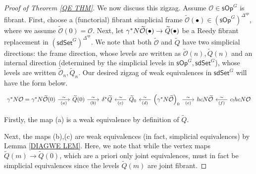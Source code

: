 \documentclass[a4paper,10pt]{article}%
\numberwithin{equation}{section}
\numberwithin{figure}{section}
\theoremstyle{definition} %
\renewcommand{\O}{\ensuremath{\mathcal O}}
\newcommand{\1}{\ensuremath{\mathbbm 1}}%
\begin{document}
\begin{proof}[Proof of Theorem \ref{QE THM}]
We now discuss this zigzag. Assume 
$\mathcal{O} \in \mathsf{sOp}^G$ is fibrant.
First, choose a (functorial) fibrant simplicial frame
$\widetilde{\mathcal{O}}(\bullet) \in (\mathsf{sOp}^G)^{\Delta^{op}}$, where we assume $\widetilde{\mathcal{O}} (0) = \mathcal{O}$.
Next, let 
$\gamma^{\**} N \widetilde{\mathcal{O}}(\bullet) 
\to \widetilde{Q}(\bullet)$
be a Reedy fibrant replacement in  
$(\mathsf{sdSet}^G)^{\Delta^{op}}$.
We note that 
both $\widetilde{\O}$ and $\widetilde{Q}$
have two simplicial directions:
the frame direction, whose levels are written as
$\widetilde{\O}(n),\widetilde{Q}(n)$
and an internal direction
(determined by the simplicial levels in $\mathsf{sOp}^G,\mathsf{sdSet}^G$),
whose levels are written 
$\widetilde{\O}_n,\widetilde{Q}_n$.
Our desired zigzag of weak equivalences in $\mathsf{sdSet}^G$
will have the form below.
\begin{equation}\label{BIGZIG EQ}
\begin{tikzcd}[column sep =20pt]
	\gamma^{\**} N \mathcal{O} =
	\gamma^{\**} N \widetilde{\mathcal{O}} (0)
	\ar{r}{\sim}[swap]{(a)}
&
	\widetilde{Q}(0)
	\ar{r}{\sim}[swap]{(b)}
&
	\delta^{\**} \widetilde{Q}
	\ar[leftarrow]{r}{\sim}[swap]{(c)}
&	
	\widetilde{Q}_0
	\ar[leftarrow]{r}{\sim}[swap]{(d)}
&
	\left(\gamma^{\**} N \widetilde{\mathcal{O}}\right)_0
		\ar{r}{\sim}[swap]{(e)}
&
	hcN \widetilde{\mathcal{O}}
	\ar[leftarrow]{r}{\sim}[swap]{(f)}
&
	c_{!} hcN \mathcal{O}
\end{tikzcd}
\end{equation}

Firstly, the map (a) is a weak equivalence by definition of 
$\widetilde{Q}$.

Next, the maps 
(b),(c) are weak equivalences (in fact, simplicial equivalences)
by Lemma \ref{DIAGWE LEM}. 
Here, we note that while the vertex maps 
$\widetilde{Q}(m) \to \widetilde{Q}(0)$,
which are a priori only joint equivalences,
must in fact be simplicial equivalences since the 
levels $\widetilde{Q}(m)$ are joint fibrant.



\end{proof}
\end{document}

